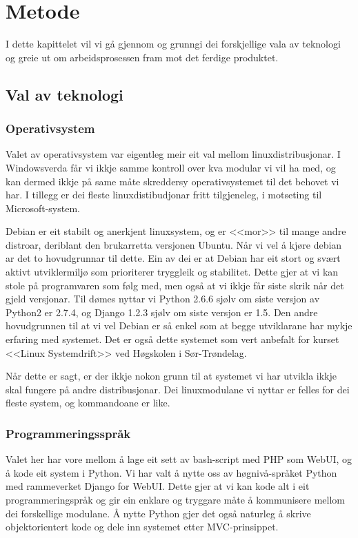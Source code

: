 \documentclass[nynorsk,12pt,a4paper,oneside]{book}
\begin{document}
\chapter{Metode}
I dette kapittelet vil vi gå gjennom og grunngi dei forskjellige vala av teknologi og greie ut om arbeidsprosessen fram mot det ferdige produktet. 
 
\section{Val av teknologi}
\subsection{Operativsystem}
Valet av operativsystem var eigentleg meir eit val mellom linuxdistribusjonar. I Windowsverda får vi ikkje samme kontroll over kva modular vi vil ha med, og kan dermed ikkje på same måte skreddersy operativsystemet til det behovet vi har. I tillegg er dei fleste linuxdistibudjonar fritt tilgjeneleg, i motseting til Microsoft-system. 

Debian er eit stabilt og anerkjent linuxsystem, og er <<mor>> til mange andre distroar, deriblant den brukarretta versjonen Ubuntu. Når vi vel å kjøre debian ar det to hovudgrunnar til dette. Ein av dei er at Debian har eit stort og svært aktivt utviklermiljø som prioriterer tryggleik og stabilitet. Dette gjer at vi kan stole på programvaren som følg med, men også at vi ikkje får siste skrik når det gjeld versjonar. Til dømes nyttar vi Python 2.6.6 sjølv om siste versjon av Python2 er 2.7.4, og Django 1.2.3 sjølv om siste versjon er 1.5. 
Den andre hovudgrunnen til at vi vel Debian er så enkel som at begge utviklarane har mykje erfaring med systemet. Det er også dette systemet som vert anbefalt for kurset <<Linux Systemdrift>> ved Høgskolen i Sør-Trøndelag.

Når dette er sagt, er der ikkje nokon grunn til at systemet vi har utvikla ikkje skal fungere på andre distribusjonar. Dei linuxmodulane vi nyttar er felles for dei fleste system, og kommandoane er like. 

\subsection{Programmeringsspråk}
Valet her har vore mellom å lage eit sett av bash-script med PHP som WebUI, og å kode eit system i Python. Vi har valt å nytte oss av høgnivå-språket Python med rammeverket Django for WebUI. Dette gjer at vi kan kode alt i eit programmeringspråk og gir ein enklare og tryggare måte å kommunisere mellom dei forskellige modulane. Å nytte Python gjer det også naturleg å skrive objektorientert kode og dele inn systemet etter MVC-prinsippet. 
\end{document}
